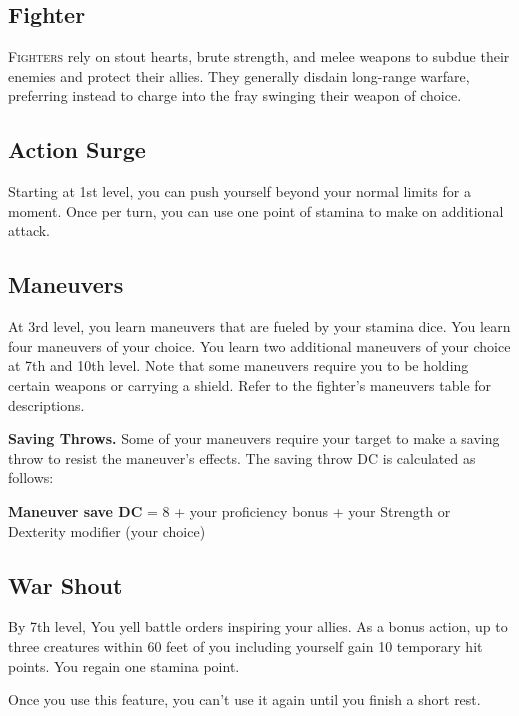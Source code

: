 
\begin{multicols*}{2}

\section{Fighter}

\lettrine[lines=3, lhang=0.15, loversize=0.25, findent=.5em]{F}{ighters} rely on stout hearts, brute strength, and melee weapons to subdue their enemies and protect their allies. They generally disdain long-range warfare, preferring instead to charge into the fray swinging their weapon of choice. 

\subsection*{Action Surge}


Starting at 1st level, you can push yourself beyond your normal limits for a moment.
Once per turn, you can use one point of stamina to make on additional attack.



\subsection*{Maneuvers}

At 3rd level, you learn maneuvers that are fueled by your stamina dice.
You learn four maneuvers of your choice. You learn two additional maneuvers of your choice at 7th and 10th level. Note that some maneuvers require you to be holding certain weapons or carrying a shield. Refer to the  fighter's maneuvers table for descriptions.

\textbf{Saving Throws.} Some of your maneuvers require your target to make a saving throw to resist the maneuver's effects. The saving throw DC is calculated as follows:

\textbf{Maneuver save DC} = 8 + your proficiency bonus + your Strength or Dexterity modifier (your choice)


\subsection*{War Shout}

By 7th level, You yell battle orders inspiring your allies. 
As a bonus action, up to three creatures within 60 feet of you including yourself gain 10 temporary hit points.
You regain one stamina point.

Once you use this feature, you can’t use it again until you finish a short rest.


\end{multicols*}
